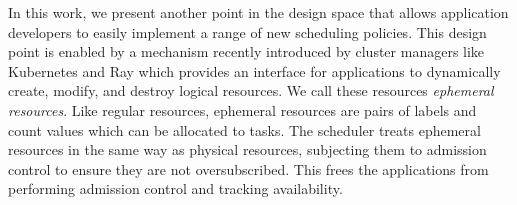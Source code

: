 


In this work, we present another point in the design space that allows application developers to easily implement a range of new scheduling policies. This design point is enabled by a mechanism recently introduced by cluster managers like Kubernetes and Ray which provides an interface for applications to dynamically create, modify, and destroy logical resources. We call these resources \emph{ephemeral resources}.  Like regular resources, ephemeral resources are pairs of labels and count values which can be allocated to tasks. The scheduler treats ephemeral resources in the same way as physical resources, subjecting them to admission control to ensure they are not oversubscribed. This frees the applications from performing admission control and tracking availability.


